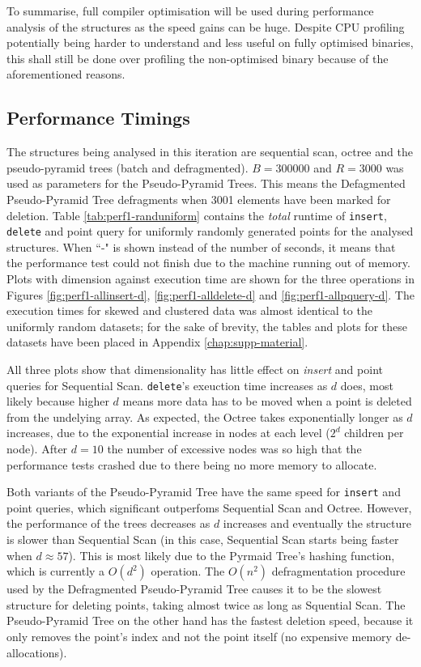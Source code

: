 To summarise, full compiler optimisation will be used during performance analysis of the structures as the speed gains can be huge. Despite CPU profiling potentially being harder to understand and less useful on fully optimised binaries, this shall still be done over profiling the non-optimised binary because of the aforementioned reasons.

\subsection{Performance Timings}

The structures being analysed in this iteration are sequential scan, octree and the pseudo-pyramid trees (batch and defragmented). $B = 300000$ and $R=3000$ was used as parameters for the Pseudo-Pyramid Trees. This means the Defagmented Pseudo-Pyramid Tree defragments when 3001 elements have been marked for deletion. Table \ref{tab:perf1-randuniform} contains the \textit{total} runtime of \texttt{insert}, \texttt{delete} and point query for uniformly randomly generated points for the analysed structures. When ``-" is shown instead of the number of seconds, it means that the performance test could not finish due to the machine running out of memory. Plots with dimension against execution time are shown for the three operations in Figures \ref{fig:perf1-allinsert-d}, \ref{fig:perf1-alldelete-d} and \ref{fig:perf1-allpquery-d}. The execution times for skewed and clustered data was almost identical to the uniformly random datasets; for the sake of brevity, the tables and plots for these datasets have been placed in Appendix \ref{chap:supp-material}. 

All three plots show that dimensionality has little effect on \textit{insert} and point queries for Sequential Scan. \texttt{delete}'s exeuction time increases as $d$ does, most likely because higher $d$ means more data has to be moved when a point is deleted from the undelying array. As expected, the Octree takes exponentially longer as $d$ increases, due to the exponential increase in nodes at each level ($2^d$ children per node). After $d = 10$ the number of excessive nodes was so high that the performance tests crashed due to there being no more memory to allocate.

Both variants of the Pseudo-Pyramid Tree have the same speed for \texttt{insert} and point queries, which significant outperfoms Sequential Scan and Octree. However, the performance of the trees decreases as $d$ increases and eventually the structure is slower than Sequential Scan (in this case, Sequential Scan starts being faster when $d \approx 57$). This is most likely due to the Pyrmaid Tree's hashing function, which is currently a $O(d^2)$ operation. The $O(n^2)$ defragmentation procedure used by the Defragmented Pseudo-Pyramid Tree causes it to be the slowest structure for deleting points, taking almost twice as long as Squential Scan. The Pseudo-Pyramid Tree on the other hand has the fastest deletion speed, because it only removes the point's index and not the point itself (no expensive memory de-allocations).

